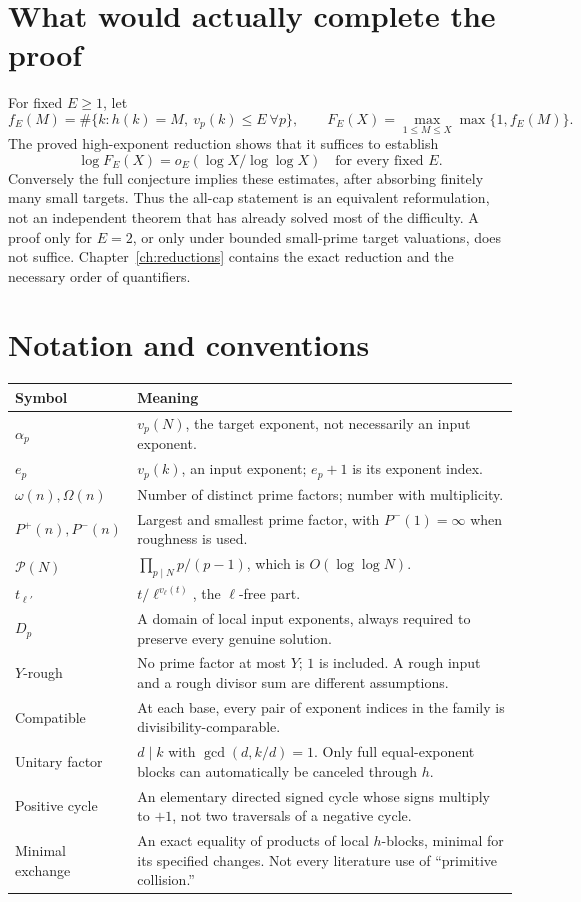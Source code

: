 \section{What would actually complete the proof}
For fixed $E\ge1$, let
\[
 f_E(M)=\#\{k:h(k)=M,\ v_p(k)\le E\ \forall p\},\qquad
 F_E(X)=\max_{1\le M\le X}\max\{1,f_E(M)\}.
\]
The proved high-exponent reduction shows that it suffices to establish
\begin{equation}\label{eq:BE-front}
 \boxed{\log F_E(X)=o_E(\log X/\log\log X)
 \quad\text{for every fixed }E.}
\end{equation}
Conversely the full conjecture implies these estimates, after absorbing finitely
many small targets. Thus the all-cap statement is an equivalent reformulation,
not an independent theorem that has already solved most of the difficulty.
A proof only for $E=2$, or only under bounded small-prime target valuations, does
not suffice. Chapter~\ref{ch:reductions} contains the exact reduction and the
necessary order of quantifiers.

\section{Notation and conventions}
\begin{longtable}{@{}p{}p{}@{}}
\toprule Symbol & Meaning\\\midrule\endhead
$\alpha_p$ & $v_p(N)$, the target exponent, not necessarily an input exponent.\\
$e_p$ & $v_p(k)$, an input exponent; $e_p+1$ is its exponent index.\\
$\omega(n),\Omega(n)$ & Number of distinct prime factors; number with multiplicity.\\
$P^+(n),P^-(n)$ & Largest and smallest prime factor, with $P^-(1)=\infty$ when roughness is used.\\
$\mathcal P(N)$ & $\prod_{p\mid N}p/(p-1)$, which is $O(\log\log N)$.\\
$t_{\ell'}$ & $t/\ell^{v_\ell(t)}$, the $\ell$-free part.\\
$D_p$ & A domain of local input exponents, always required to preserve every genuine solution.\\
$Y$-rough & No prime factor at most $Y$; $1$ is included. A rough input and a rough divisor sum are different assumptions.\\
Compatible & At each base, every pair of exponent indices in the family is divisibility-comparable.\\
Unitary factor & $d\mid k$ with $\gcd(d,k/d)=1$. Only full equal-exponent blocks can automatically be canceled through $h$.\\
Positive cycle & An elementary directed signed cycle whose signs multiply to $+1$, not two traversals of a negative cycle.\\
Minimal exchange & An exact equality of products of local $h$-blocks, minimal for its specified changes. Not every literature use of ``primitive collision.''\\
\bottomrule
\end{longtable}

